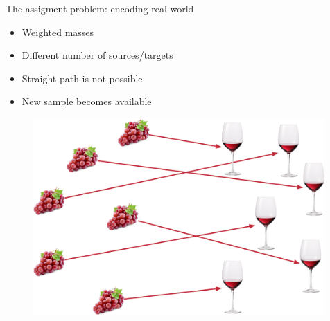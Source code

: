 \documentclass[pdf,aspectratio=169,10pt]{beamer}
\begin{document}
\begin{frame}{The assigment problem: encoding real-world}

\begin{minipage}{0.45\textwidth}
\begin{itemize}
    \item Weighted masses
    \item Different number of sources/targets
    \item Straight path is not possible
    \item New sample becomes available
\end{itemize}
\end{minipage}
\hfill
\begin{minipage}{0.5\textwidth}
 \begin{figure}
        \includegraphics[width=0.99\textwidth]{../img/wine_assignment.pdf}  
    \end{figure}
\end{minipage}

\end{frame}
\end{document}
